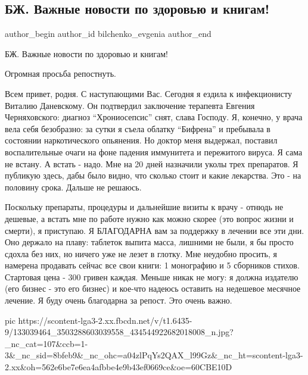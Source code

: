  
 
 
 
 
 
\subsection{БЖ. Важные новости по здоровью и книгам!}
\label{sec:24_12_2020.fb.bilchenko_evgenia.1.zdorovje_knigi}
\ifcmt
 author_begin
   author_id bilchenko_evgenia
 author_end
\fi

БЖ. Важные новости по здоровью и книгам!

Огромная просьба репостнуть.

Всем привет, родня. С наступающими Вас. Сегодня я ездила к инфекционисту
Виталию Даневскому. Он подтвердил заключение терапевта Евгения Черняховского:
диагноз \enquote{Хрониосепсис} снят, слава Господу. Я, конечно, у врача вела себя
безобразно: за сутки я съела облатку \enquote{Бифрена} и пребывала в состоянии
наркотического опьянения. Но доктор меня выдержал, поставил воспалительные
очаги на фоне падения иммунитета и пережитого вируса. Я сама не встану. А
встать -  надо. Мне на 20 дней назначили уколы трех препаратов. Я публикую
здесь, дабы было видно, что сколько стоит и какие лекарства. Это - на половину
срока. Дальше не решаюсь. 

Поскольку препараты, процедуры и дальнейшие визиты к врачу - отнюдь не дешевые,
а встать мне по работе нужно как можно скорее (это вопрос жизни и смерти), я
приступаю. Я БЛАГОДАРНА вам за поддержку в лечении все эти дни. Оно держало на
плаву: таблеток выпита масса, лишними не были, я бы просто сдохла без них, но
ничего уже не лезет в глотку. Мне неудобно просить, я намерена продавать сейчас
все свои книги: 1 монографию и 5 сборников стихов. Стартовая цена - 300 гривен
каждая. Меньше никак не могу: я должна издателю (его бизнес - это его бизнес) и
кое-что надеюсь оставить на недешевое месячное лечение. Я буду очень благодарна
за репост. Это очень важно. 

\ifcmt
  pic https://scontent-lga3-2.xx.fbcdn.net/v/t1.6435-9/133039464_3503288603039558_434544922682018008_n.jpg?_nc_cat=107&ccb=1-3&_nc_sid=8bfeb9&_nc_ohc=a04zlPqYs2QAX_l99Gz&_nc_ht=scontent-lga3-2.xx&oh=562e6be7e6ea4afbbe4e9b43ef0669ce&oe=60CBE10D

